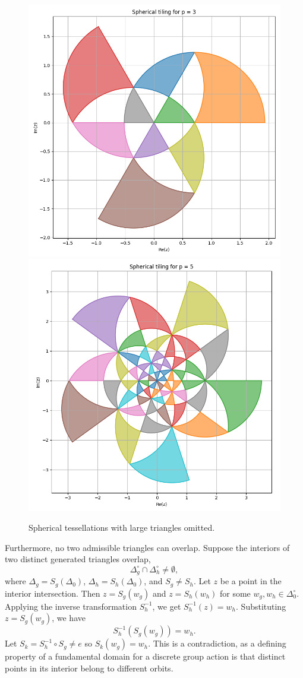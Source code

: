 \documentclass{article}
\begin{document}
\begin{figure}
    \centering
    \includegraphics[width=0.45\linewidth]{images/tiling_3.png}
    \includegraphics[width=0.45\linewidth]{images/tiling_5.png}
    \caption{Spherical tessellations with large triangles omitted.}
\end{figure}

Furthermore, no two admissible triangles can overlap. Suppose the interiors of two distinct generated triangles overlap, 
\[ \Delta_g^\circ \cap \Delta_h^\circ \neq \emptyset, \]
where \(\Delta_g = S_g(\Delta_0)\), \(\Delta_h = S_h(\Delta_0)\), and \(S_g \neq S_h\). Let \(z\) be a point in the interior intersection. Then \(z = S_g(w_g)\) and \(z = S_h(w_h)\) for some \(w_g, w_h \in \Delta_0^\circ\). Applying the inverse transformation \(S_h^{-1}\), we get \(S_h^{-1}(z) = w_h\). Substituting \(z = S_g(w_g)\), we have 
\[S_h^{-1}(S_g(w_g)) = w_h.\]
Let \(S_k = S_h^{-1} \circ S_g \neq e\) so \(S_k(w_g) = w_h\). This is a contradiction, as a defining property of a fundamental domain for a discrete group action is that distinct points in its interior belong to different orbits.
\end{document}
